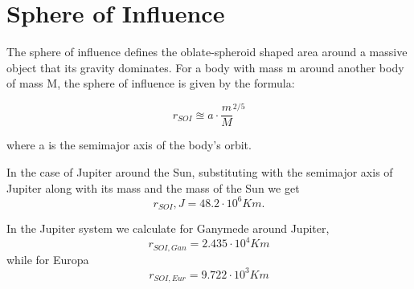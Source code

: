\chapter{Sphere of Influence}\label{app:sphere_of_infl}  
The sphere of influence defines the oblate-spheroid shaped area around a massive object that its gravity dominates. For a body with mass m around another body of mass M, the sphere of influence is given by the formula:

\begin{equation}
r_{SOI} \approxeq a\cdot \frac{m}{M}^{2/5}
\end{equation}

where a is the semimajor axis of the body's orbit.

In the case of Jupiter around the Sun, substituting with the semimajor axis of Jupiter along with its mass and the mass of the Sun we get 
\begin{equation}
r_{SOI},J=48.2\cdot 10^6 Km.     
\end{equation}

In the Jupiter system we calculate for Ganymede around Jupiter,
\begin{equation}
r_{SOI,Gan}=2.435\cdot 10^4 Km    
\end{equation}
while for Europa 
\begin{equation}
r_{SOI,Eur}=9.722\cdot 10^3 Km    
\end{equation}
 